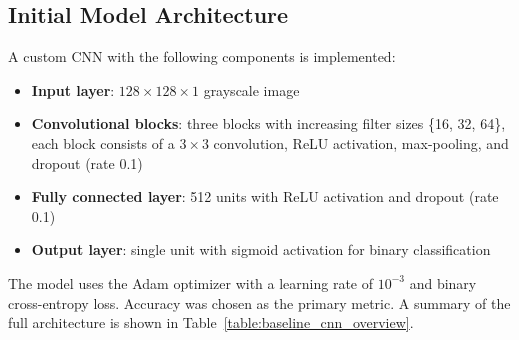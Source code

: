 \documentclass[conference]{IEEEtran}
\begin{document}
\subsection{Initial Model Architecture}
A custom CNN with the following components is implemented:
\begin{itemize}
	\item \textbf{Input layer}: $128\times128\times1$ grayscale image
	\item \textbf{Convolutional blocks}: three blocks with increasing filter sizes \{16, 32, 64\}, each block consists of a $3\times3$ convolution, ReLU activation, max-pooling, and dropout (rate 0.1)
	\item \textbf{Fully connected layer}: 512 units with ReLU activation and dropout (rate 0.1)
	\item \textbf{Output layer}: single unit with sigmoid activation for binary classification
\end{itemize}
\vspace{0.5cm}

The model uses the Adam optimizer with a learning rate of $10^{-3}$ and binary cross-entropy loss. Accuracy was chosen as the primary metric. A summary of the full architecture is shown in Table~\ref{table:baseline_cnn_overview}.
\end{document}
